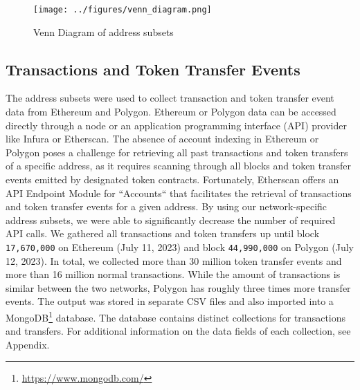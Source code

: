 \documentclass[12pt,a4paper,titlepage,oneside,english]{article}
\begin{document}
\begin{figure}[h!]
	\centering
	\texttt{[image: ../figures/venn\_diagram.png]}
	\caption{Venn Diagram of address subsets}
	\label{fig:Venn}
\end{figure} 

\subsection{Transactions and Token Transfer Events}
The address subsets were used to collect transaction and token transfer event data from Ethereum and Polygon. Ethereum or Polygon data can be accessed directly through a node or an application programming interface (API) provider like Infura or Etherscan. The absence of account indexing in Ethereum or Polygon poses a challenge for retrieving all past transactions and token transfers of a specific address, as it requires scanning through all blocks and token transfer events emitted by designated token contracts. Fortunately, Etherscan offers an API Endpoint Module for ``Accounts`` that facilitates the retrieval of transactions and token transfer events for a given address. By using our network-specific address subsets, we were able to significantly decrease the number of required API calls. 
We gathered all transactions and token transfers up until block \texttt{17,670,000} on Ethereum (July 11, 2023) and block \texttt{44,990,000} on Polygon (July 12, 2023). In total, we collected more than 30 million %
token transfer events and more than 16 million %
 normal transactions. While the amount of transactions is similar between the two networks, Polygon has roughly three times more transfer events. \newline The output was stored in separate CSV files and also imported into a MongoDB\footnote{\url{https://www.mongodb.com/}} database. The database contains distinct collections for transactions and transfers. For additional information on the data fields of each collection, see Appendix. 
 

\iffalse
Transfer Events: 30,689,978
Transfer Events Ethereum: 7,832,778
Transfer Events Polygon: 22,857,200

Transactions = 16,092,531
Transactions Ethereum = 8,448,584
Transactions Polygon = 7,643,947

Figure X visualizes the number of daily transactions and token transfers for each chain.
\begin{figure}[h!]
	\centering
	\texttt{[image: ../figures/transfers\_tx\_by\_chain.png]}
	\caption{Monthly Transactions and Token Transfers by chain}
	\label{fig:Data}
\end{figure} 
Transfer Events, adding Information (isInSet) \\
Transactions \\
Filtering, Intra-set transfers\\
Data Structure, Fields \\
\fi
\end{document}
